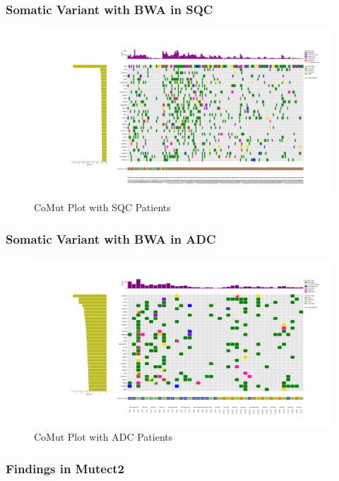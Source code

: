 \documentclass{beamer}
\begin{document}
    \begin{frame}
        \frametitle{Somatic Variant with BWA in SQC}

        \begin{figure}
            \includegraphics[width=\linewidth]{figures/Mutect2/BWA-SQC.pdf}
            \caption{CoMut Plot with SQC Patients}
        \end{figure}
    \end{frame}

    \begin{frame}
        \frametitle{Somatic Variant with BWA in ADC}

        \begin{figure}
            \includegraphics[width=\linewidth]{figures/Mutect2/BWA-ADC.pdf}
            \caption{CoMut Plot with ADC Patients}
        \end{figure}
    \end{frame}

    \begin{frame}
        \frametitle{Findings in Mutect2}
    \end{frame}
\end{document}
